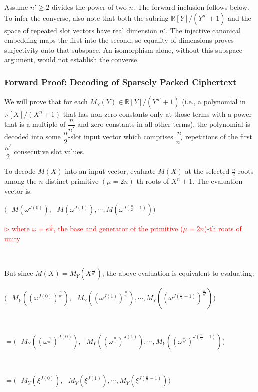 Assume $n'\geq2$ divides the power-of-two $n$. The forward inclusion follows below. To infer the converse, also note that both the subring $\mathbb{R}[Y]/(Y^{n'}+1)$ and the space of repeated slot vectors have real dimension $n'$. The injective canonical embedding maps the first into the second, so equality of dimensions proves surjectivity onto that subspace. An isomorphism alone, without this subspace argument, would not establish the converse.

\subsubsection{Forward Proof: Decoding of Sparsely Packed Ciphertext}

We will prove that for each $M_Y(Y) \in \mathbb{R}[Y] / (Y^{n'} + 1)$ (i.e., a polynomial in $\mathbb{R}[X] / (X^n + 1)$ that has non-zero constants only at those terms with a power that is a multiple of $\dfrac{n}{n'}$ and zero constants in all other terms), the polynomial is decoded into some $\dfrac{n}{2}$-slot input vector which comprises $\dfrac{n}{n'}$ repetitions of the first $\dfrac{n'}{2}$ consecutive slot values.

To decode $M(X)$ into an input vector, evaluate $M(X)$ at the selected $\frac{n}{2}$ roots among the $n$ distinct primitive $(\mu=2n)$-th roots of $X^n + 1$. The evaluation vector is:

$\bm{(} \text{ }
M(\omega^{J(0)}), \text{ } M(\omega^{J(1)}), \cdots,  M(\omega^{J(\frac{n}{2}-1)})\bm{)}$

\textcolor{red}{ $\rhd$ where $\omega=e^{\frac{i\pi}{n}}$, the base and generator of the primitive ($\mu=2n$)-th roots of unity}

$ $

But since $M(X) = M_Y(X^{\frac{n}{n'}})$, the above evaluation is equivalent to evaluating:

$\bm{(} \text{ }
M_Y((\omega^{J(0)})^{\frac{n}{n'}}), \text{ } M_Y((\omega^{J(1)})^{\frac{n}{n'}}), \cdots,  M_Y((\omega^{J(\frac{n}{2}-1)})^{\frac{n}{n'}}) \bm{)}$

$ $

$= \bm{(} \text{ }
M_Y((\omega^{\frac{n}{n'}})^{J(0)}), \text{ } M_Y((\omega^{\frac{n}{n'}})^{J(1)}), \cdots,  M_Y((\omega^{\frac{n}{n'}})^{J(\frac{n}{2}-1)})\bm{)}$

$ $

$= \bm{(} \text{ }
M_Y(\xi^{J(0)}), \text{ } M_Y(\xi^{J(1)}), \cdots,  M_Y(\xi^{J(\frac{n}{2}-1)})\bm{)}$

